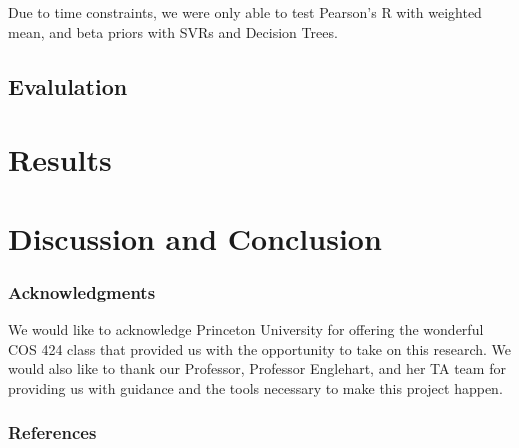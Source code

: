 \documentclass{article} %
\begin{document}
Due to time constraints, we were only able to test Pearson's R with weighted mean, and beta priors with SVRs and Decision Trees.

\subsection{Evalulation}


\section{Results}


\section{Discussion and Conclusion}

\subsubsection*{Acknowledgments}
We would like to acknowledge Princeton University for offering the wonderful COS 424 class that provided us with the opportunity to take on this research. We would also like to thank our Professor, Professor Englehart, and her TA team for providing us with guidance and the tools necessary to make this project happen.


\subsubsection*{References}
\end{document}
